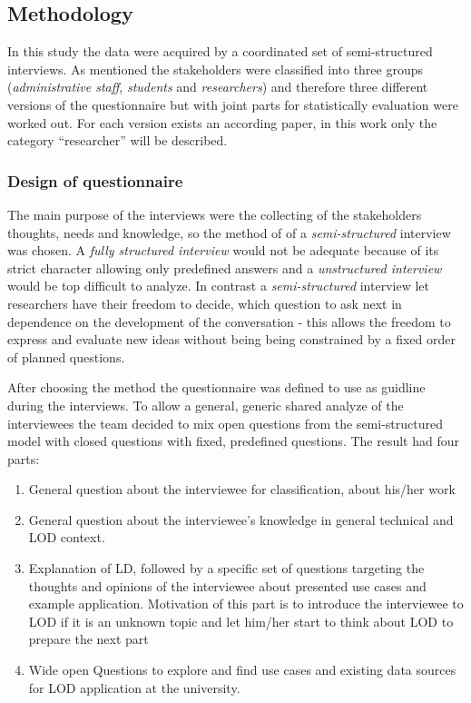 \subsection{Methodology}\label{subsection:methodology}
In this study the data were acquired by a coordinated set of semi-structured interviews. As mentioned the stakeholders were classified into three groups (\textit{administrative staff}, \textit{students} and \textit{researchers}) and therefore three different versions of the questionnaire but with joint parts for statistically evaluation were worked out. For each version exists an according paper, in this work only the category ``researcher'' will be described.

\subsubsection{Design of questionnaire}
The main purpose of the interviews were the collecting of the stakeholders thoughts, needs and knowledge, so the method of of a \textit{semi-structured} interview was chosen. A \textit{fully structured interview} would not be adequate because of its strict character allowing only predefined answers and a \textit{unstructured interview} would be top difficult to analyze. In contrast a \textit{semi-structured} interview let researchers have their freedom to decide, which question to ask next in dependence on the development of the conversation - this allows the freedom to express and evaluate new ideas without being being constrained by a
fixed order of planned questions.

After choosing the method the questionnaire was defined to use as guidline during the interviews. To allow a general, generic shared analyze of the interviewees the team decided to mix open questions from the semi-structured model with closed questions with fixed, predefined questions. The result had four parts:

\begin{enumerate}
	\item General question about the interviewee for classification, about his/her work
	\item General question about the interviewee's knowledge in general technical and LOD context.
	\item Explanation of LD, followed by a specific set of questions targeting the thoughts and opinions of the interviewee about presented use cases and example application. Motivation of this part is to introduce the interviewee to LOD if it is an unknown topic and let him/her start to think about LOD to prepare the next part
	\item Wide open Questions to explore and find use cases and existing data sources for LOD application at the university.
\end{enumerate}

